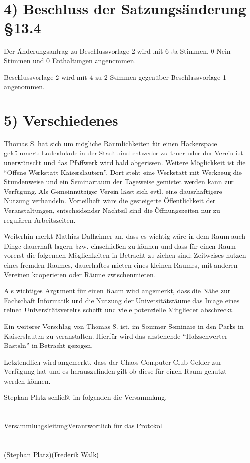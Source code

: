 \documentclass{scrartcl}
\begin{document}
\section*{4) Beschluss der Satzungsänderung \S13.4}
    
    Der Änderungsantrag zu Beschlussvorlage 2 wird mit 6 Ja-Stimmen, 0 Nein-Stimmen und 0 Enthaltungen angenommen.

    Beschlussvorlage 2 wird mit 4 zu 2 Stimmen gegenüber Beschlussvorlage 1 angenommen.

\section*{5) Verschiedenes}

    Thomas S. hat sich um mögliche Räumlichkeiten für einen Hackerspace gekümmert: Ladenlokale in der Stadt sind entweder zu teuer oder der Verein ist unerwünscht und das Pfaffwerk wird bald abgerissen. Weitere Möglichkeit ist die ``Offene Werkstatt Kaiserslautern''. Dort steht eine Werkstatt mit Werkzeug die Stundenweise und ein Seminarraum der Tageweise gemietet werden kann zur Verfügung. Als Gemeinnütziger Verein lässt sich evtl. eine dauerhaftigere Nutzung verhandeln. Vorteilhaft wäre die gesteigerte Öffentlichkeit der Veranstaltungen, entscheidender Nachteil sind die Öffnungszeiten nur zu regulären Arbeitszeiten.

    Weiterhin merkt Mathias Dalheimer an, dass es wichtig wäre in dem Raum auch Dinge dauerhaft lagern bzw. einschließen zu können und dass für einen Raum vorerst die folgenden Möglichkeiten in Betracht zu ziehen sind: Zeitweises nutzen eines fremden Raumes, dauerhaftes mieten eines kleinen Raumes, mit anderen Vereinen kooperieren oder Räume zwischenmieten.

    Als wichtiges Argument für einen Raum wird angemerkt, dass die Nähe zur Fachschaft Informatik und die Nutzung der Universitätsräume das Image eines reinen Universitätsvereins schafft und viele potenzielle Mitglieder abschreckt.

    Ein weiterer Vorschlag von Thomas S. ist, im Sommer Seminare in den Parks in Kaiserslauten zu veranstalten. Hierfür wird das anstehende ``Holzschwerter Basteln'' in Betracht gezogen.

    Letztendlich wird angemerkt, dass der Chaos Computer Club Gelder zur Verfügung hat und es herauszufinden gilt ob diese für einen Raum genutzt werden können.

    Stephan Platz schließt im folgenden die Versammlung.
\section*{}

Versammlungsleitung\hspace{5cm}Verantwortlich für das Protokoll\\
\\
\\
(Stephan Platz)\hspace{5.9cm}(Frederik Walk)
\\
\\
\end{document}
